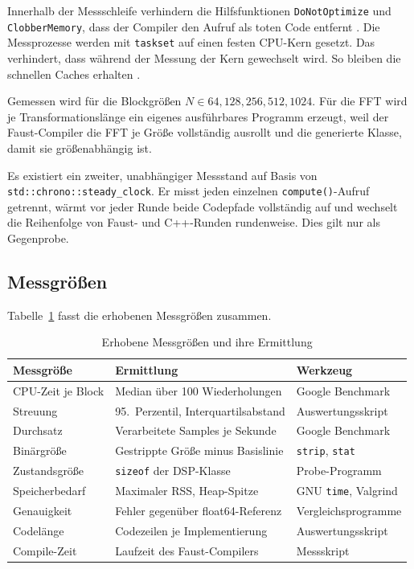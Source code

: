 Innerhalb der Messschleife verhindern die Hilfsfunktionen \texttt{DoNotOptimize} und
\texttt{ClobberMemory}, dass der Compiler den Aufruf als toten Code
entfernt \parencite{googlebenchmark}. Die Messprozesse werden mit \texttt{taskset} auf einen festen CPU-Kern gesetzt. Das verhindert, dass während der Messung der Kern gewechselt wird. So bleiben die schnellen Caches erhalten \parencite{mytkowicz2009producing}.

Gemessen wird für die Blockgrößen $N \in {64, 128, 256, 512, 1024}$. Für
die FFT wird je Transformationslänge ein eigenes ausführbares Programm
erzeugt, weil der Faust-Compiler die FFT je Größe vollständig ausrollt und die
generierte Klasse, damit sie größenabhängig ist.

Es existiert ein zweiter, unabhängiger Messstand auf Basis von
\texttt{std::chrono::steady\_clock}. Er misst jeden einzelnen
\texttt{compute()}-Aufruf getrennt, wärmt vor jeder Runde beide Codepfade
vollständig auf und wechselt die Reihenfolge von Faust- und C++-Runden rundenweise.
Dies gilt nur als Gegenprobe.

\subsection{Messgrößen}
\label{sec:messgroessen}

Tabelle~\ref{tab:messgroessen} fasst die erhobenen Messgrößen zusammen.

\begin{table}[htb]
	\centering
	\small
	\caption{Erhobene Messgrößen und ihre Ermittlung}
	\label{tab:messgroessen}
	\begin{tabularx}{\textwidth}{@{} l X l @{}}
		\toprule
		\textbf{Messgröße} & \textbf{Ermittlung} & \textbf{Werkzeug} \\
		\midrule
		CPU-Zeit je Block & Median über 100 Wiederholungen      & Google Benchmark \\
		Streuung          & 95.~Perzentil, Interquartilsabstand & Auswertungsskript \\
		Durchsatz         & Verarbeitete Samples je Sekunde     & Google Benchmark \\
		Binärgröße        & Gestrippte Größe minus Basislinie   & \texttt{strip}, \texttt{stat} \\
		Zustandsgröße     & \texttt{sizeof} der DSP-Klasse      & Probe-Programm \\
		Speicherbedarf    & Maximaler RSS, Heap-Spitze          & GNU \texttt{time}, Valgrind \\
		Genauigkeit       & Fehler gegenüber float64-Referenz   & Vergleichsprogramme \\
		Codelänge         & Codezeilen je Implementierung       & Auswertungsskript \\
		Compile-Zeit      & Laufzeit des Faust-Compilers        & Messskript \\
		\bottomrule
	\end{tabularx}
\end{table}

